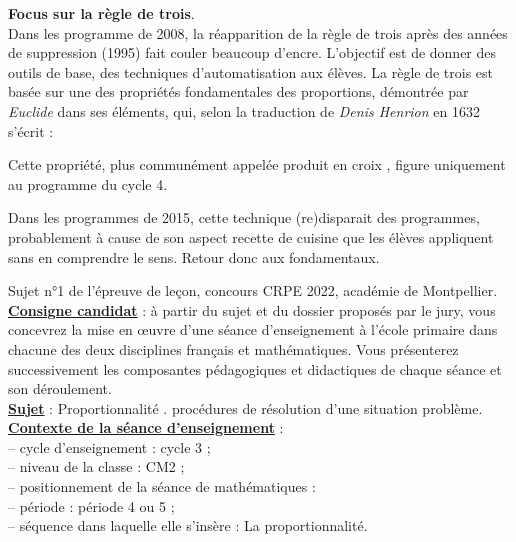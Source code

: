 {\bf\large Focus sur la règle de trois}. \\
Dans les programme de 2008, la réapparition de la \og règle de trois \fg{} après des années de suppression (1995) fait couler beaucoup d'encre. L'objectif est de donner des outils de base, des techniques d'automatisation aux élèves. La règle de trois est basée sur une des propriétés fondamentales des proportions, démontrée par {\it Euclide} dans ses éléments, qui, selon la traduction de {\it Denis Henrion} en 1632 s'écrit :
\begin{center}
\end{center}
Cette propriété, plus communément appelée \og produit en croix \fg, figure uniquement au programme du cycle 4.

Dans les programmes de 2015, cette technique (re)disparait des programmes, probablement à cause de son aspect \og recette de cuisine \fg{} que les élèves appliquent sans en comprendre le sens. Retour donc aux fondamentaux.


\activites

\textcolor{G1}{Sujet n°1 de l'épreuve de leçon, concours CRPE 2022, académie de Montpellier.} \\

{\bf\uline{Consigne candidat}} : à partir du sujet et du dossier proposés par le jury, vous concevrez la mise en œuvre d'une séance d'enseignement à l'école primaire dans chacune des deux disciplines français et mathématiques. Vous présenterez successivement les composantes pédagogiques et didactiques de chaque séance et son déroulement. \\

{\bf\uline{Sujet}} : Proportionnalité . procédures de résolution d'une situation problème. \\

{\bf\uline{Contexte de la séance d'enseignement}} : \\
   \hspace*{5mm} -- cycle d'enseignement : cycle 3 ; \\
   \hspace*{5mm} -- niveau de la classe : CM2 ; \\
   \hspace*{5mm} -- positionnement de la séance de mathématiques : \\
      \hspace*{10mm} -- période : période 4 ou 5 ; \\
      \hspace*{10mm} -- séquence dans laquelle elle s'insère : La proportionnalité. \\ [5mm]


